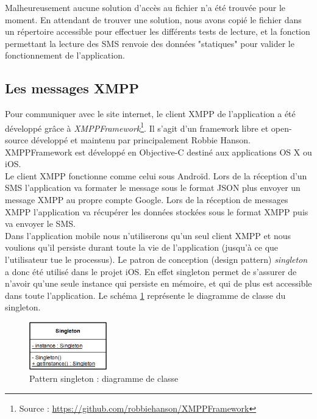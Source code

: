 Malheureusement aucune solution d'accès au fichier n'a été trouvée pour le moment.
En attendant de trouver une solution, nous avons copié le fichier dans un répertoire accessible pour effectuer les différents tests de lecture, et la fonction permettant la lecture des SMS renvoie des données "statiques" pour valider le fonctionnement de l'application.




\subsection{Les messages XMPP}

Pour communiquer avec le site internet, le client XMPP de l'application a été développé grâce à \textit{XMPPFramework}\footnote{Source : \href{https://github.com/robbiehanson/XMPPFramework}{https://github.com/robbiehanson/XMPPFramework}}.
Il s'agit d'un framework libre et open-source développé et maintenu par principalement Robbie Hanson.
XMPPFramework est développé en Objective-C destiné aux applications OS X ou iOS.
\\


Le client XMPP fonctionne comme celui sous Androïd.
Lors de la réception d'un SMS l'application va formater le message sous le format JSON plus envoyer un message XMPP au propre compte Google.
Lors de la réception de messages XMPP l'application va récupérer les données stockées sous le format XMPP puis va envoyer le SMS.
\\


Dans l'application mobile nous n'utiliserons qu'un seul client XMPP et nous voulions qu'il persiste durant toute la vie de l'application (jusqu'à ce que l'utilisateur tue le processus).
Le patron de conception (design pattern) \textit{singleton} a donc été utilisé dans le projet iOS.
En effet singleton permet de s'assurer de n'avoir qu'une seule instance qui persiste en mémoire, et qui de plus est accessible dans toute l'application.
Le schéma \ref{pattern_singleton} représente le diagramme de classe du singleton.
\begin{figure}[!h]
	\center
	\includegraphics[width=0.3\textwidth]{img/pattern_singleton.png}
	\caption{Pattern singleton : diagramme de classe}
	\label{pattern_singleton}
\end{figure}
